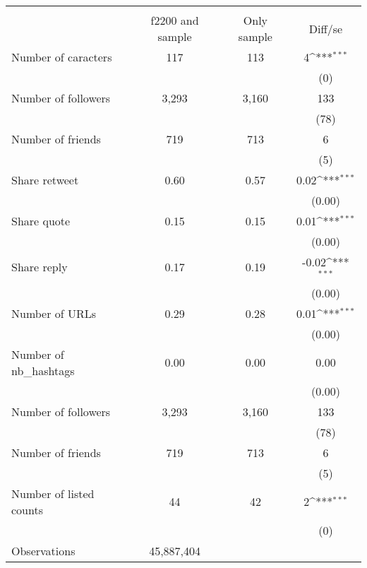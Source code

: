 {
\def\sym#1{\ifmmode^{#1}\else\(^{#1}\)\fi}
\begin{tabular}{l*{1}{ccc}}
\hline\hline
                    &\multicolumn{3}{c}{}                           \\
                    &f2200 and sample& Only sample&     Diff/se         \\
\hline
Number of caracters &         117&         113&           4\sym{***}\\
                    &            &            &         (0)         \\
Number of followers &       3,293&       3,160&         133         \\
                    &            &            &        (78)         \\
Number of friends   &         719&         713&           6         \\
                    &            &            &         (5)         \\
Share retweet       &        0.60&        0.57&        0.02\sym{***}\\
                    &            &            &      (0.00)         \\
Share quote         &        0.15&        0.15&        0.01\sym{***}\\
                    &            &            &      (0.00)         \\
Share reply         &        0.17&        0.19&       -0.02\sym{***}\\
                    &            &            &      (0.00)         \\
Number of URLs      &        0.29&        0.28&        0.01\sym{***}\\
                    &            &            &      (0.00)         \\
Number of nb\_hashtags&        0.00&        0.00&        0.00         \\
                    &            &            &      (0.00)         \\
Number of followers &       3,293&       3,160&         133         \\
                    &            &            &        (78)         \\
Number of friends   &         719&         713&           6         \\
                    &            &            &         (5)         \\
Number of listed counts&          44&          42&           2\sym{***}\\
                    &            &            &         (0)         \\
\hline
Observations        &  45,887,404&            &                     \\
\hline\hline
\end{tabular}
}
